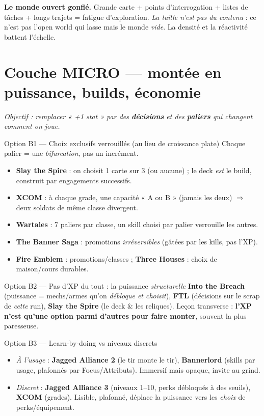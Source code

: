 \documentclass[11pt,a4paper]{article}
\newcommand{\jeu}[1]{\textbf{#1}}
\begin{document}
\begin{antipat}
\textbf{Le monde ouvert gonflé.} Grande carte + points d'interrogation + listes de tâches + longs trajets = fatigue d'exploration. \emph{La taille n'est pas du contenu} : ce n'est pas l'open world qui lasse mais le monde \emph{vide}. La densité et la réactivité battent l'échelle.
\end{antipat}

\section{Couche MICRO --- montée en puissance, builds, économie}
\emph{Objectif : remplacer « +1 stat » par des \textbf{décisions} et des \textbf{paliers} qui changent \emph{comment} on joue.}

\begin{optionbox}{Option B1 --- Choix exclusifs verrouillés (au lieu de croissance plate)}
Chaque palier = une \emph{bifurcation}, pas un incrément.
\begin{itemize}
\item \jeu{Slay the Spire} : on choisit 1 carte sur 3 (ou aucune) ; le deck \emph{est} le build, construit par engagements successifs.
\item \jeu{XCOM} : à chaque grade, une capacité « A ou B » (jamais les deux) $\Rightarrow$ deux soldats de même classe divergent.
\item \jeu{Wartales} : 7 paliers par classe, un skill choisi par palier verrouille les autres.
\item \jeu{The Banner Saga} : promotions \emph{irréversibles} (gâtées par les kills, pas l'XP).
\item \jeu{Fire Emblem} : promotions/classes ; \jeu{Three Houses} : choix de maison/cours durables.
\end{itemize}
\end{optionbox}

\begin{optionbox}{Option B2 --- Pas d'XP du tout : la puissance \emph{structurelle}}
\jeu{Into the Breach} (puissance = mechs/armes qu'on \emph{débloque et choisit}), \jeu{FTL} (décisions sur le scrap de \emph{cette} run), \jeu{Slay the Spire} (le deck \& les reliques). Leçon transverse : \textbf{l'XP n'est qu'une option parmi d'autres pour faire monter}, souvent la plus paresseuse.
\end{optionbox}

\begin{optionbox}{Option B3 --- Learn-by-doing vs niveaux discrets}
\begin{itemize}
\item \emph{À l'usage} : \jeu{Jagged Alliance 2} (le tir monte le tir), \jeu{Bannerlord} (skills par usage, plafonnés par Focus/Attributs). Immersif mais opaque, invite au grind.
\item \emph{Discret} : \jeu{Jagged Alliance 3} (niveaux 1--10, perks débloqués à des seuils), \jeu{XCOM} (grades). Lisible, plafonné, déplace la puissance vers les \emph{choix} de perks/équipement.
\end{itemize}
\end{optionbox}
\end{document}
